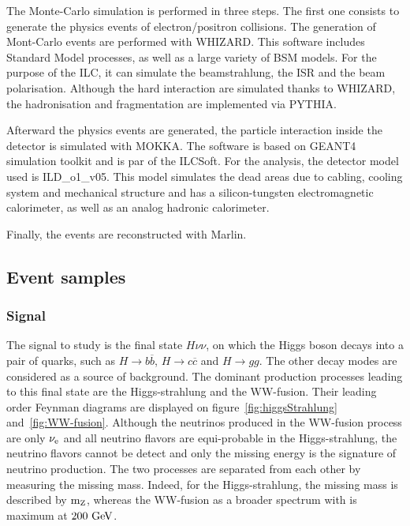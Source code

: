     The Monte-Carlo simulation is performed in three steps.
    The first one consists to generate the physics events of electron/positron collisions.
    The generation of Mont-Carlo events are performed with WHIZARD.
    This software includes Standard Model processes, as well as a large variety of BSM models.
    For the purpose of the \gls{ILC}, it can simulate the beamstrahlung, the \gls{ISR} and the beam polarisation.
    Although the hard interaction are simulated thanks to WHIZARD, the hadronisation and fragmentation are implemented via PYTHIA.
    
    Afterward the physics events are generated, the particle interaction inside the detector is simulated with MOKKA.
    The software is based on GEANT4 simulation toolkit and is par of the ILCSoft.
    For the analysis, the detector model used is ILD\_o1\_v05.
    This model simulates the dead areas due to cabling, cooling system and mechanical structure and has a silicon-tungsten electromagnetic calorimeter, as well as an analog hadronic calorimeter.
    
    Finally, the events are reconstructed with Marlin.

  \subsection{Event samples}

  \subsubsection{Signal}

    The signal to study is the final state $H \nu\nu$, on which the Higgs boson decays into a pair of quarks, such as $H \rightarrow b\overline{b}$, $H \rightarrow c\overline{c}$ and $H \rightarrow gg$. 
    The other decay modes are considered as a source of background. 
    The dominant production processes leading to this final state are the Higgs-strahlung and the WW-fusion.
    Their leading order Feynman diagrams are displayed on figure~\ref{fig:higgsStrahlung} and~\ref{fig:WW-fusion}.
    Although the neutrinos produced in the WW-fusion process are only $\nu_{\rm{e}}$ and all neutrino flavors are equi-probable in the Higgs-strahlung, the neutrino flavors cannot be detect and only the missing energy is the signature of neutrino production.
    The two processes are separated from each other by measuring the missing mass.
    Indeed, for the Higgs-strahlung, the missing mass is described by $\rm{m_Z}$, whereas the WW-fusion as a broader spectrum with is maximum at $200~\rm{GeV}$.

